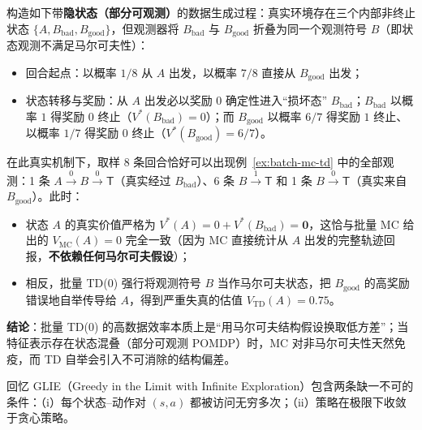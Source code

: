 
构造如下带\textbf{隐状态（部分可观测）}的数据生成过程：真实环境存在三个内部非终止状态 $\{A, B_{\mathrm{bad}}, B_{\mathrm{good}}\}$，但观测器将 $B_{\mathrm{bad}}$ 与 $B_{\mathrm{good}}$ 折叠为同一个观测符号 $B$（即状态观测不满足马尔可夫性）：
\begin{itemize}
  \item 回合起点：以概率 $1/8$ 从 $A$ 出发，以概率 $7/8$ 直接从 $B_{\mathrm{good}}$ 出发；
  \item 状态转移与奖励：从 $A$ 出发必以奖励 $0$ 确定性进入“损坏态” $B_{\mathrm{bad}}$；$B_{\mathrm{bad}}$ 以概率 $1$ 得奖励 $0$ 终止（$V^*(B_{\mathrm{bad}}) = 0$）；而 $B_{\mathrm{good}}$ 以概率 $6/7$ 得奖励 $1$ 终止、以概率 $1/7$ 得奖励 $0$ 终止（$V^*(B_{\mathrm{good}}) = 6/7$）。
\end{itemize}
在此真实机制下，取样 8 条回合恰好可以出现例~\ref{ex:batch-mc-td} 中的全部观测：1 条 $A \xrightarrow{0} B \xrightarrow{0} \mathsf{T}$（真实经过 $B_{\mathrm{bad}}$）、6 条 $B \xrightarrow{1} \mathsf{T}$ 和 1 条 $B \xrightarrow{0} \mathsf{T}$（真实来自 $B_{\mathrm{good}}$）。此时：
\begin{itemize}
  \item 状态 $A$ 的真实价值严格为 $V^*(A) = 0 + V^*(B_{\mathrm{bad}}) = \mathbf{0}$，这恰与批量 MC 给出的 $V_{\mathrm{MC}}(A) = 0$ 完全一致（因为 MC 直接统计从 $A$ 出发的完整轨迹回报，\textbf{不依赖任何马尔可夫假设}）；
  \item 相反，批量 TD(0) 强行将观测符号 $B$ 当作马尔可夫状态，把 $B_{\mathrm{good}}$ 的高奖励错误地自举传导给 $A$，得到严重失真的估值 $V_{\mathrm{TD}}(A) = 0.75$。
\end{itemize}
\textbf{结论}：批量 TD(0) 的高数据效率本质上是“用马尔可夫结构假设换取低方差”；当特征表示存在状态混叠（部分可观测 POMDP）时，MC 对非马尔可夫性天然免疫，而 TD 自举会引入不可消除的结构偏差。


回忆 GLIE（Greedy in the Limit with Infinite Exploration）包含两条缺一不可的条件：（i）每个状态--动作对 $(s, a)$ 都被访问无穷多次；（ii）策略在极限下收敛于贪心策略。

